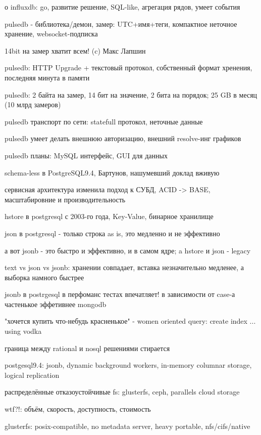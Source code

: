  \item о influxdb: go, развитие решение, SQL-like, агрегация рядов, умеет события
  \item pulsedb - библиотека/демон, замер: UTC+имя+теги, компактное неточное хранение, websocket-подписка
  \item 14bit на замер хватит всем! (c) Макс Лапшин
  \item pulsedb: HTTP Upgrade + текстовый протокол, собственный формат хренения, последняя минута в памяти
  \item pulsedb: 2 байта на замер, 14 бит на значение, 2 бита на порядок; 25 GB в месяц (10 млрд замеров)
  \item pulsedb транспорт по сети: statefull протокол, неточные данные
  \item pulsedb умеет делать внешнюю авторизацию, внешний resolve-инг графиков
  \item pulsedb планы: MySQL интерфейс, GUI для данных
  \item schema-less в PostgreSQL9.4, Бартунов, нашумевший доклад вживую
  \item сервисная архитектура изменила подход к СУБД, ACID -> BASE, масштабировние и производительность
  \item hstore в postgresql с 2003-го года, Key-Value, бинарное хранилище
  \item json в postgresql - только строка as is, это медленно и не эффективно
  \item а вот jsonb - это быстро и эффективно, и в самом ядре; a hstore и json - legacy
  \item text vs json vs jsonb: хранении совпадает, вставка незначительно медленее, а выборка намного быстрее
  \item jsonb в postrgesql в перфоманс тестах впечатляет! в зависимости от case-а частенькое эффетивнее mongodb
  \item "хочется купить что-небудь красненькое" - women oriented query: create index ... using vodka
  \item граница между rational и nosql решениями стирается
  \item postgesql9.4: jsonb, dynamic background workers, in-memory columnar storage, logical replication
  \item распределённые отказоустойчивые fs: glusterfs, ceph, parallels cloud storage
  \item wtf?!: объём, скорость, доступность, стоимость
  \item glusterfs: posix-compatible, no metadata server, heavy portable, nfs/cifs/native
